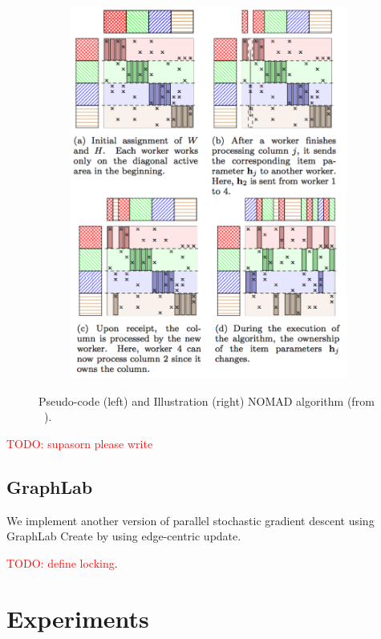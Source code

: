 \documentclass{article} %
\newcommand{\todo}[1]{\textcolor{red}{TODO: #1}}
\begin{document}
\begin{figure}[hb]
\begin{subfigure}[b]{0.5\textwidth}
    \includegraphics[width=\textwidth]{figures/nomad}
    \label{fig:nomad}
  \end{subfigure}
  \vspace{-20pt}
  \caption{Pseudo-code (left) and Illustration (right) NOMAD algorithm (from ~\cite{yun2013nomad}).}
\end{figure}

\todo{supasorn please write}

\subsection{GraphLab}

We implement another version of parallel stochastic gradient descent using GraphLab Create by using edge-centric update.

\todo{define locking}.

\section{Experiments}
\end{document}
